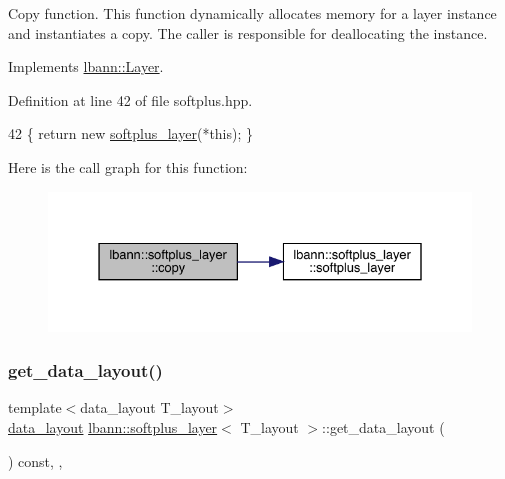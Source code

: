 Copy function. This function dynamically allocates memory for a layer instance and instantiates a copy. The caller is responsible for deallocating the instance. 

Implements \hyperlink{classlbann_1_1Layer_af420f22bbac801c85483ade84588a23f}{lbann\+::\+Layer}.



Definition at line 42 of file softplus.\+hpp.


\begin{DoxyCode}
42 \{ \textcolor{keywordflow}{return} \textcolor{keyword}{new} \hyperlink{classlbann_1_1softplus__layer_a5c80b19945ae94541bf5edb53b664c69}{softplus\_layer}(*\textcolor{keyword}{this}); \}
\end{DoxyCode}
Here is the call graph for this function\+:\nopagebreak
\begin{figure}[H]
\begin{center}
\leavevmode
\includegraphics[width=331pt]{classlbann_1_1softplus__layer_aef624d9020d403f6a19da8742ec9c1d2_cgraph}
\end{center}
\end{figure}
\mbox{\label{classlbann_1_1softplus__layer_a1bc0899e41772148e581b7b8c53763e3}} 
\subsubsection{\texorpdfstring{get\+\_\+data\+\_\+layout()}{get\_data\_layout()}}
{\footnotesize\ttfamily template$<$data\+\_\+layout T\+\_\+layout$>$ \\
\hyperlink{base_8hpp_a786677cbfb3f5677b4d84f3056eb08db}{data\+\_\+layout} \hyperlink{classlbann_1_1softplus__layer}{lbann\+::softplus\+\_\+layer}$<$ T\+\_\+layout $>$\+::get\+\_\+data\+\_\+layout (\begin{DoxyParamCaption}{ }\end{DoxyParamCaption}) const\hspace{0.3cm}{\ttfamily [inline]}, {\ttfamily [override]}, {\ttfamily [virtual]}}

